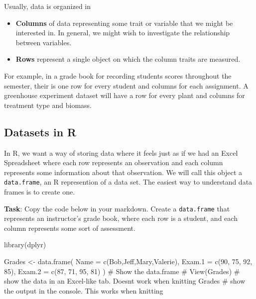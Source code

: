 \documentclass[
  letterpaper,
  DIV=11,
  numbers=noendperiod]{scrreprt}
\newenvironment{Shaded}{\begin{snugshade}}{\end{snugshade}}
\newcommand{\AttributeTok}[1]{\textcolor[rgb]{0.40,0.45,0.13}{#1}}
\newcommand{\CommentTok}[1]{\textcolor[rgb]{0.37,0.37,0.37}{#1}}
\newcommand{\DecValTok}[1]{\textcolor[rgb]{0.68,0.00,0.00}{#1}}
\newcommand{\FunctionTok}[1]{\textcolor[rgb]{0.28,0.35,0.67}{#1}}
\newcommand{\NormalTok}[1]{\textcolor[rgb]{0.00,0.23,0.31}{#1}}
\newcommand{\OtherTok}[1]{\textcolor[rgb]{0.00,0.23,0.31}{#1}}
\newcommand{\StringTok}[1]{\textcolor[rgb]{0.13,0.47,0.30}{#1}}
\providecommand{\tightlist}{%
  \setlength{\itemsep}{0pt}\setlength{\parskip}{0pt}}\usepackage{longtable,booktabs,array}
\begin{document}
Usually, data is organized in

\begin{itemize}
\tightlist
\item
  \textbf{Columns} of data representing some trait or variable that we
  might be interested in. In general, we might wish to investigate the
  relationship between variables.
\item
  \textbf{Rows} represent a single object on which the column traits are
  measured.
\end{itemize}

For example, in a grade book for recording students scores throughout
the semester, their is one row for every student and columns for each
assignment. A greenhouse experiment dataset will have a row for every
plant and columns for treatment type and biomass.

\subsection{Datasets in R}\label{datasets-in-r}

In R, we want a way of storing data where it feels just as if we had an
Excel Spreadsheet where each row represents an observation and each
column represents some information about that observation. We will call
this object a \texttt{data.frame}, an R represention of a data set. The
easiest way to understand data frames is to create one.

\textbf{Task}: Copy the code below in your markdown. Create a
\texttt{data.frame} that represents an instructor's grade book, where
each row is a student, and each column represents some sort of
assessment.

\begin{Shaded}
\begin{Highlighting}[]
\FunctionTok{library}\NormalTok{(dplyr)}

\NormalTok{Grades }\OtherTok{\textless{}{-}} \FunctionTok{data.frame}\NormalTok{(}
  \AttributeTok{Name  =} \FunctionTok{c}\NormalTok{(}\StringTok{\textquotesingle{}Bob\textquotesingle{}}\NormalTok{,}\StringTok{\textquotesingle{}Jeff\textquotesingle{}}\NormalTok{,}\StringTok{\textquotesingle{}Mary\textquotesingle{}}\NormalTok{,}\StringTok{\textquotesingle{}Valerie\textquotesingle{}}\NormalTok{),     }
  \AttributeTok{Exam.1 =} \FunctionTok{c}\NormalTok{(}\DecValTok{90}\NormalTok{, }\DecValTok{75}\NormalTok{, }\DecValTok{92}\NormalTok{, }\DecValTok{85}\NormalTok{),}
  \AttributeTok{Exam.2 =} \FunctionTok{c}\NormalTok{(}\DecValTok{87}\NormalTok{, }\DecValTok{71}\NormalTok{, }\DecValTok{95}\NormalTok{, }\DecValTok{81}\NormalTok{)}
\NormalTok{)}
\CommentTok{\# Show the data.frame }
\CommentTok{\# View(Grades)  \# show the data in an Excel{-}like tab.  Doesn\textquotesingle{}t work when knitting }
\NormalTok{Grades          }\CommentTok{\# show the output in the console. This works when knitting}
\end{Highlighting}
\end{Shaded}
\end{document}
